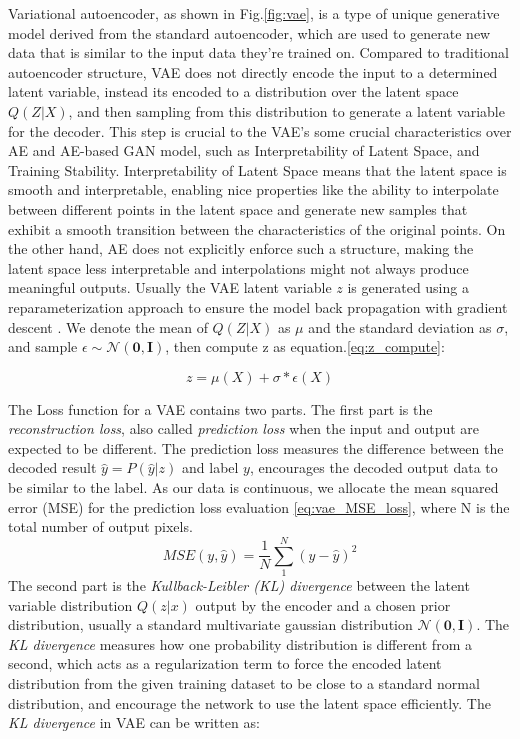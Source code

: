  
Variational autoencoder, as shown in  Fig.\ref{fig:vae}, is a type of unique generative model derived from the standard autoencoder, which are used to generate new data that is similar to the input data they're trained on. 
Compared to traditional autoencoder structure, VAE does not directly encode the input to a determined latent variable, instead its encoded to a distribution over the latent space $Q(Z|X)$, and then sampling from this distribution to generate a latent variable for the decoder. This step is crucial to the VAE's some crucial characteristics over AE and AE-based GAN model, such as Interpretability of Latent Space, and Training Stability.
Interpretability of Latent Space means that the latent space is smooth and interpretable, enabling nice properties like the ability to interpolate between different points in the latent space and generate new samples that exhibit a smooth transition between the characteristics of the original points. On the other hand, AE does not explicitly enforce such a structure, making the latent space less interpretable and interpolations might not always produce meaningful outputs. 
Usually the VAE latent variable $z$ is generated using a reparameterization approach to ensure the model back propagation with gradient descent . We denote the mean of $Q(Z|X)$ as $\mu$ and the standard deviation as $\sigma$, and sample $\epsilon \sim \mathcal{N}(\textbf{0}, \textbf{I} ) $, then compute z as equation.\eqref{eq:z_compute}:

\begin{equation}
	\label{eq:z_compute}
	z = \mu(\textit{X}) + \sigma \ast \epsilon(\textit{X})
\end{equation}


The Loss function for a VAE contains two parts. The first part is the \textit{reconstruction loss}, also called \textit{prediction loss} when the input and output are expected to be different. The prediction loss measures the difference between the decoded result $\hat{y} = P(\hat{y}|z)$ and label $y$, encourages the decoded output data to be similar to the label. As our data is continuous, we allocate the mean squared error (MSE) for the prediction loss evaluation \eqref{eq:vae_MSE_loss}, where N is the total number of output pixels.
\begin{equation}
	\label{eq:vae_MSE_loss}
	\textit{MSE}(y, \hat{y}) = \frac{1}{N} \sum_{1}^{N} ( y - \hat{y})^{2}
\end{equation}
The second part is the \textit{Kullback-Leibler (KL) divergence} between the latent variable distribution $Q(z|x)$ output by the encoder and a chosen prior distribution, usually a standard multivariate gaussian distribution $\mathcal{N}(\textbf{0}, \textbf{I})$. The \textit{KL divergence} measures how one probability distribution is different from a second, which acts as a regularization term to force the encoded latent distribution from the given training dataset to be close to a standard normal distribution, and encourage the network to use the latent space efficiently. 
The \textit{KL divergence} in VAE can be written as:

